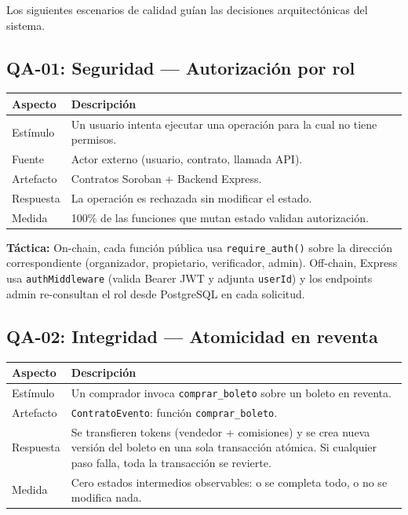 \documentclass[12pt,oneside]{article}
\begin{document}
Los siguientes escenarios de calidad guían las decisiones arquitectónicas del sistema.

\subsection{QA-01: Seguridad — Autorización por rol}

\begin{table}[htbp]
\centering
\begin{tabularx}{\textwidth}{l X}
\toprule
\textbf{Aspecto} & \textbf{Descripción} \\
\midrule
Estímulo & Un usuario intenta ejecutar una operación para la cual no tiene permisos. \\
Fuente & Actor externo (usuario, contrato, llamada API). \\
Artefacto & Contratos Soroban + Backend Express. \\
Respuesta & La operación es rechazada sin modificar el estado. \\
Medida & 100\% de las funciones que mutan estado validan autorización. \\
\bottomrule
\end{tabularx}
\end{table}

\textbf{Táctica:} On-chain, cada función pública usa \texttt{require\_auth()} sobre la dirección correspondiente (organizador, propietario, verificador, admin). Off-chain, Express usa \texttt{authMiddleware} (valida Bearer JWT y adjunta \texttt{userId}) y los endpoints admin re-consultan el rol desde PostgreSQL en cada solicitud.

\subsection{QA-02: Integridad — Atomicidad en reventa}

\begin{table}[htbp]
\centering
\begin{tabularx}{\textwidth}{l X}
\toprule
\textbf{Aspecto} & \textbf{Descripción} \\
\midrule
Estímulo & Un comprador invoca \texttt{comprar\_boleto} sobre un boleto en reventa. \\
Artefacto & \texttt{ContratoEvento}: función \texttt{comprar\_boleto}. \\
Respuesta & Se transfieren tokens (vendedor + comisiones) y se crea nueva versión del boleto en una sola transacción atómica. Si cualquier paso falla, toda la transacción se revierte. \\
Medida & Cero estados intermedios observables: o se completa todo, o no se modifica nada. \\
\bottomrule
\end{tabularx}
\end{table}
\end{document}
